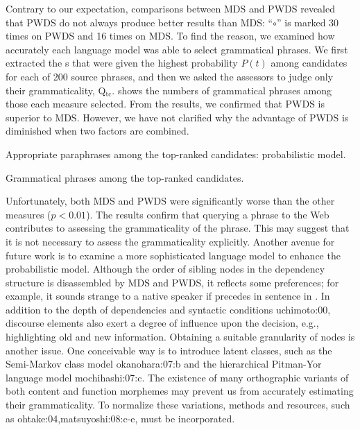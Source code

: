 \documentclass[english]{jnlp_1.4}
\renewcommand{\cite}{}
\begin{document}
Contrary to our expectation, comparisons between MDS and PWDS revealed
that PWDS do not always produce better results than MDS: ``$\circ$''
is marked 30 times on PWDS and 16 times on MDS.
To find the reason, we examined how accurately each language model was
able to select grammatical phrases.
We first extracted the {\pc}s that were given the highest probability
$P(t)$ among candidates for each of 200 source phrases, and then we
asked the assessors to judge only their grammaticality,
Q$_{\text{tc}}$.
 shows the numbers of grammatical phrases
among those each measure selected.  From the results, we confirmed
that PWDS is superior to MDS.  However, we have not clarified why the
advantage of PWDS is diminished when two factors are combined.

\begin{table}[t]
\caption{Appropriate paraphrases among the top-ranked candidates:
  probabilistic model.}
\label{tab:gen-prob}

\end{table}
\begin{table}[t]
\caption{Grammatical phrases among the top-ranked candidates.}
\label{tab:gen-grammaticality}

\end{table}

Unfortunately, both MDS and PWDS were significantly worse than the
other measures ($p<\text{0.01}$).  The results confirm that querying a
phrase to the Web contributes to assessing the grammaticality of the
phrase.
This may suggest that it is not necessary to assess the grammaticality
explicitly.
Another avenue for future work is to examine a more sophisticated
language model to enhance the probabilistic model.
Although the order of sibling nodes in the dependency structure is
disassembled by MDS and PWDS, it reflects some preferences; for
example, it sounds strange to a native speaker if  precedes  in sentence in
.
In addition to the depth of dependencies and syntactic conditions
\cite{uchimoto:00}, discourse elements also exert a degree of
influence upon the decision, e.g., highlighting old and new
information.
Obtaining a suitable granularity of nodes is another issue.  One
conceivable way is to introduce latent classes, such as the
Semi-Markov class model \cite{okanohara:07:b} and the hierarchical
Pitman-Yor language model \cite{mochihashi:07:c}.
The existence of many orthographic variants of both content and
function morphemes may prevent us from accurately estimating their
grammaticality.  To normalize these variations, methods and resources,
such as \cite{ohtake:04,matsuyoshi:08:c-e}, must be incorporated.
\end{document}
